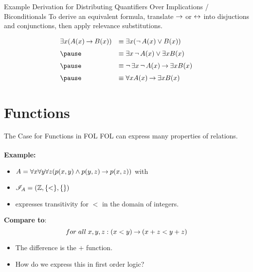 \documentclass[style=sailor,size=12pt]{powerdot}
\begin{document}
\begin{wideslide}[bm=,toc=]{Example Derivation for Distributing Quantifiers Over
Implications / Biconditionals}
To derive an equivalent formula, translate $\mathbin{\rightarrow}$ or $\mathbin{\leftrightarrow}$ into disjuctions and
conjunctions, then apply relevance substitutions.
\begin{displaymath}
\def\arraystretch{1.5}
\begin{array}{ll}
\exists x (A(x) \imp B(x))  & \equiv \exists x(\ngg A(x) \lor B(x)) \\
\pause &\equiv \exists x\ngg A(x) \lor \exists x B(x) \\
\pause  &\equiv \ngg \exists x\ngg A(x) \imp \exists x B(x) \\
\pause &\equiv \forall x A(x) \imp \exists x B(x) \\

\end{array}
\end{displaymath}

\end{wideslide}

\section[slide=true]{Functions}
\begin{slide}[bm=,toc=]{The Case for Functions in FOL}
FOL can express many properties of relations. 
\\~\\
\pause
{\bf Example:}
\begin{itemize}
\item $A = \forall x \forall y \forall z (p(x,y) \land p (y,z) \mathbin{\rightarrow} p(x,z))$ with
\item $\mathcal{I}_A = (\mathbb{Z},\{<\},\{\})$
\item expresses transitivity for $<$ in the domain of integers.
\end{itemize}
\vspace{2ex}
\pause
{\bf Compare to}:
\[
  for\; all\;  x,y,z: (x < y) \mathbin{\rightarrow} (x + z < y + z)
  \]

\vspace{-1ex}
\pause
\begin{itemize}
\item The difference is the $+$ function.
\item How do we express this in first order logic?
\end{itemize}

\end{slide}
\end{document}
